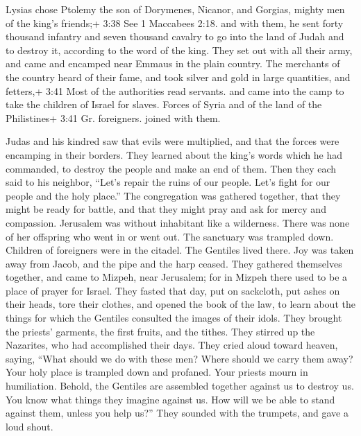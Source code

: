  Lysias chose Ptolemy the son of Dorymenes, Nicanor, and
Gorgias, mighty men of the king's friends;+ 3:38 See 1 Maccabees 2:18.
 and with them, he sent forty thousand infantry and seven
thousand cavalry to go into the land of Judah and to destroy it,
according to the word of the king.  They set out with all
their army, and came and encamped near Emmaus in the plain country.
 The merchants of the country heard of their fame, and took
silver and gold in large quantities, and fetters,+ 3:41 Most of the
authorities read servants. and came into the camp to take the children
of Israel for slaves. Forces of Syria and of the land of the
Philistines+ 3:41 Gr. foreigners. joined with them.

 Judas and his kindred saw that evils were multiplied, and
that the forces were encamping in their borders. They learned about the
king's words which he had commanded, to destroy the people and make an
end of them.  Then they each said to his neighbor, ``Let's
repair the ruins of our people. Let's fight for our people and the holy
place.''  The congregation was gathered together, that they
might be ready for battle, and that they might pray and ask for mercy
and compassion.  Jerusalem was without inhabitant like a
wilderness. There was none of her offspring who went in or went out. The
sanctuary was trampled down. Children of foreigners were in the citadel.
The Gentiles lived there. Joy was taken away from Jacob, and the pipe
and the harp ceased.  They gathered themselves together,
and came to Mizpeh, near Jerusalem; for in Mizpeh there used to be a
place of prayer for Israel.  They fasted that day, put on
sackcloth, put ashes on their heads, tore their clothes, 
and opened the book of the law, to learn about the things for which the
Gentiles consulted the images of their idols.  They brought
the priests' garments, the first fruits, and the tithes. They stirred up
the Nazarites, who had accomplished their days.  They cried
aloud toward heaven, saying, ``What should we do with these men? Where
should we carry them away?  Your holy place is trampled
down and profaned. Your priests mourn in humiliation. 
Behold, the Gentiles are assembled together against us to destroy us.
You know what things they imagine against us.  How will we
be able to stand against them, unless you help us?''  They
sounded with the trumpets, and gave a loud shout.

